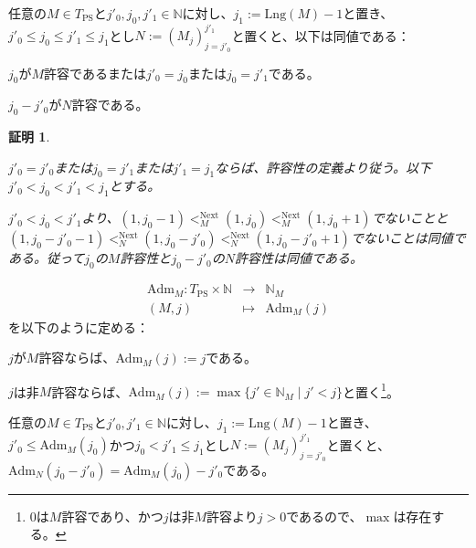 \documentclass[dvipdfmx,uplatex]{jsarticle}
\theoremstyle{customnonumberbreakfortheorem}
\theoremstyle{customnonumberbreakforproof}
\newtheorem{hideableproof}{証明}
\begin{document}
\begin{proposition}[許容性の切片への遺伝性]\label{許容性の切片への遺伝性}
	任意の\(M \in T_{\textrm{PS}}\)と\(j'_0, j_0, j'_1 \in \mathbb{N}\)に対し、\(j_1 := \textrm{Lng}(M) - 1\)と置き、\(j'_0 \leq j_0 \leq j'_1 \leq j_1\)とし\(N := (M_j)_{j=j'_0}^{j'_1}\)と置くと、以下は同値である：
	\begin{penumerate}
		\item \(j_0\)が\(M\)許容であるまたは\(j'_0 = j_0\)または\(j_0 = j'_1\)である。
		\item \(j_0-j'_0\)が\(N\)許容である。
	\end{penumerate}
\end{proposition}

\begin{hideableproof}
	\begin{indented}
		\item \(j'_0 = j'_0\)または\(j_0 = j'_1\)または\(j'_1 = j_1\)ならば、許容性の定義より従う。以下\(j'_0 < j_0 < j'_1 < j_1\)とする。
		\item \(j'_0 < j_0 < j'_1\)より、\((1,j_0-1) <_M^{\textrm{Next}} (1,j_0) <_M^{\textrm{Next}} (1,j_0+1)\)でないことと\((1,j_0-j'_0-1) <_N^{\textrm{Next}} (1,j_0-j'_0) <_N^{\textrm{Next}} (1,j_0-j'_0+1)\)でないことは同値である。従って\(j_0\)の\(M\)許容性と\(j_0-j'_0\)の\(N\)許容性は同値である。
	\end{indented}
\end{hideableproof}

\begin{eqnarray*}
\textrm{Adm}_M \colon T_{\textrm{PS}} \times \mathbb{N} & \to & \mathbb{N}_M \\
(M,j) & \mapsto & \textrm{Adm}_M(j)
\end{eqnarray*}
を以下のように定める：
\begin{nenumerate}
	\item \(j\)が\(M\)許容ならば、\(\textrm{Adm}_M(j) := j\)である。
	\item \(j\)は非\(M\)許容ならば、\(\textrm{Adm}_M(j) := \max \{j' \in \mathbb{N}_M \mid j' < j\}\)と置く\footnote{\(0\)は\(M\)許容であり、かつ\(j\)は非\(M\)許容より\(j > 0\)であるので、\(\max\)は存在する。}。
\end{nenumerate}

\begin{proposition}[許容化の切片への遺伝性]\label{許容化の切片への遺伝性}
	任意の\(M \in T_{\textrm{PS}}\)と\(j'_0,j'_1 \in \mathbb{N}\)に対し、\(j_1 := \textrm{Lng}(M) - 1\)と置き、\(j'_0 \leq \textrm{Adm}_M(j_0)\)かつ\(j_0 < j'_1 \leq j_1\)とし\(N := (M_j)_{j=j'_0}^{j'_1}\)と置くと、\(\textrm{Adm}_N(j_0-j'_0) = \textrm{Adm}_M(j_0)-j'_0\)である。
\end{proposition}
\end{document}
